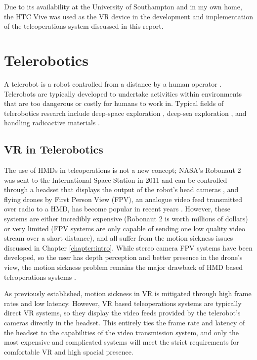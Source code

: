 Due to its availability at the University of Southampton and in my own home, the HTC Vive was used as the VR device in the development and implementation of the teleoperations system discussed in this report. 

\section{Telerobotics}

A telerobot is a robot controlled from a distance by a human operator \cite{sheridan1989telerobotics}. Telerobots are typically developed to undertake activities within environments that are too dangerous or costly for humans to work in. Typical fields of telerobotics research include deep-space exploration \cite{fong2017interactive}, deep-sea exploration \cite{huvenne2018rovs}, and handling radioactive materials \cite{smith2017radiation}.

\subsection{VR in Telerobotics}
\label{subsection:VRTele}

The use of HMDs in teleoperations is not a new concept; NASA's Robonaut 2 was sent to the International Space Station in 2011 and can be controlled through a headset that displays the output of the robot's head cameras \cite{Robonaut}, and flying drones by First Person View (FPV), an analogue video feed transmitted over radio to a HMD, has become popular in recent years \cite{FPV}. However, these systems are either incredibly expensive (Robonaut 2 is worth millions of dollars) or very limited (FPV systems are only capable of sending one low quality video stream over a short distance), and all suffer from the motion sickness issues discussed in Chapter \ref{chapter:intro}. While stereo camera FPV systems have been developed, so the user has depth perception and better presence in the drone's view, the motion sickness problem remains the major drawback of HMD based teleoperations systems \cite{2FPV}.

As previously established, motion sickness in VR is mitigated through high frame rates and low latency. However, VR based teleoperations systems are typically direct VR systems, so they display the video feeds provided by the telerobot's cameras directly in the headset. This entirely ties the frame rate and latency of the headset to the capabilities of the video transmission system, and only the most expensive and complicated systems will meet the strict requirements for comfortable VR and high spacial presence.


